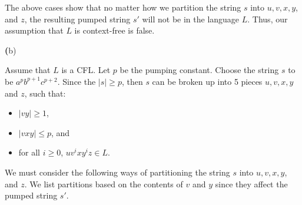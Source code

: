 \documentclass[11pt]{article}
\renewcommand{\part}[1] {{\vspace{0.15in}\noindent\textbf (#1)} \vspace{0.10in}}
\begin{document}
The above cases show that no matter how we partition the string $s$ into $u,v,x, y$, and $z$, the resulting pumped string $s'$ will not be in the language $L$.  Thus, our assumption that $L$ is context-free is false. 

\part{b}

Assume that $L$ is a CFL.  Let $p$ be the pumping constant.  Choose the string $s$ to be $a^pb^{p+1}c^{p+2}$.  Since the $|s| \geq p$, then $s$ can be broken up into 5 pieces $u,v,x,y$ and $z$, such that:
\begin{itemize}
	\item $|vy| \geq 1$,
	\item $|vxy| \leq p$, and
	\item for all $i \geq 0$, $uv^ixy^iz \in L$.
\end{itemize} 

\noindent 
We must consider the following ways of partitioning the string $s$ into $u,v,x,y$, and $z$. We list partitions based on the contents of $v$ and $y$ since they affect the pumped string $s'$.
\end{document}
